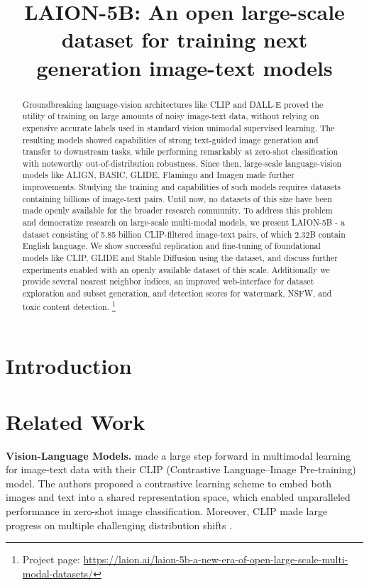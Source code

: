 \title{LAION-5B: An open large-scale dataset for training next generation image-text models}

\begin{abstract}
Groundbreaking language-vision architectures like CLIP and DALL-E proved the utility of training on large amounts of noisy image-text data, without relying on expensive accurate labels used in standard vision unimodal supervised learning. The resulting models showed capabilities of strong text-guided image generation and transfer to downstream tasks, while performing remarkably at zero-shot classification with noteworthy out-of-distribution robustness. Since then, large-scale language-vision models like ALIGN, BASIC, GLIDE, Flamingo and Imagen made further improvements. Studying the training and capabilities of such models requires datasets containing billions of image-text pairs. Until now, no datasets of this size have been made openly available for the broader research community. To address this problem and democratize research on large-scale multi-modal models, we present LAION-5B - a dataset consisting of 5.85 billion CLIP-filtered image-text pairs, of which 2.32B contain English language. We show successful replication and fine-tuning of foundational models like CLIP, GLIDE and Stable Diffusion using the dataset, and discuss further experiments enabled with an openly available dataset of this scale. Additionally we provide several nearest neighbor indices, an improved web-interface for dataset exploration and subset generation, and detection scores for watermark, NSFW, and toxic content detection. \footnote{Project page:  \href{https://laion.ai/laion-5b-a-new-era-of-open-large-scale-multi-modal-datasets/}{https://laion.ai/laion-5b-a-new-era-of-open-large-scale-multi-modal-datasets/}}
\end{abstract}

\section{Introduction}
\label{sec:intro}

\section{Related Work}
\label{sec:related_works}

\textbf{Vision-Language Models.} \citet{radford2021learning} made a large step forward in multimodal learning for image-text data with their CLIP (Contrastive Language–Image Pre-training) model. The authors proposed a contrastive learning scheme to embed both images and text into a shared representation space, which enabled unparalleled performance in zero-shot image classification. Moreover, CLIP made large progress on multiple challenging distribution shifts \citep{taori2020measuring, wortsman2021robust}.

